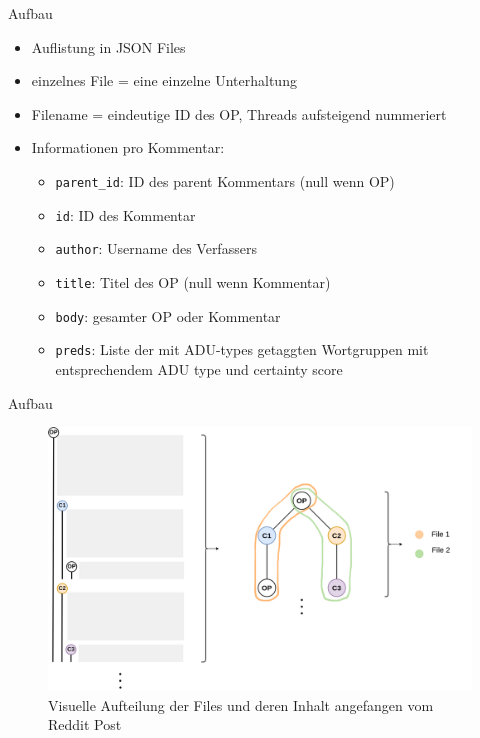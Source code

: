 \documentclass[compress,12pt]{beamer}
\begin{document}
    \begin{frame}{Aufbau}
        \begin{itemize}
            \item Auflistung in JSON Files
            \item einzelnes File = eine einzelne Unterhaltung
            \item Filename = eindeutige ID des OP, Threads aufsteigend nummeriert
            \item Informationen pro Kommentar:
            \begin{itemize}
                \item \texttt{parent\_id}: ID des parent Kommentars (null wenn OP)
                \item \texttt{id}: ID des Kommentar
                \item \texttt{author}: Username des Verfassers
                \item \texttt{title}: Titel des OP (null wenn Kommentar)
                \item \texttt{body}: gesamter OP oder Kommentar
                \item \texttt{preds}: Liste der mit ADU-types getaggten Wortgruppen mit entsprechendem ADU type und certainty score
            \end{itemize}
        \end{itemize}
    \end{frame}

    \begin{frame}{Aufbau}
        \begin{figure}
            \centering
            \includegraphics[width=\textwidth]{../images/data-files-structure}
            \caption{Visuelle Aufteilung der Files und deren Inhalt angefangen vom Reddit Post}
            \label{fig:data-structure}
        \end{figure}
    \end{frame}
\end{document}
